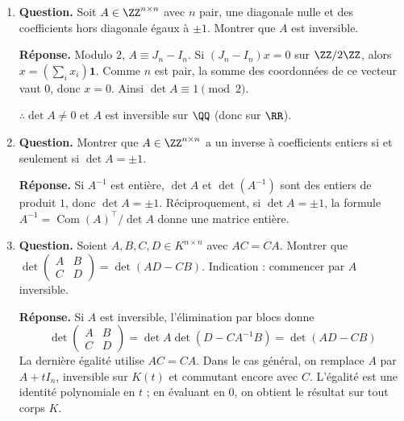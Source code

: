\documentclass[12pt, a4paper]{article}
\begin{document}
\begin{enumerate}[label=5.\arabic*., start=54]
  \item \begin{minipage}[t]{\linewidth}\raggedright
\textbf{Question.} Soit $A\in\ZZ^{n\times n}$ avec $n$ pair, une diagonale nulle et des coefficients hors diagonale égaux à $\pm1$. Montrer que $A$ est inversible.
\par\smallskip
\textbf{Réponse.} Modulo $2$, $A\equiv J_n-I_n$. Si $(J_n-I_n)x=0$ sur $\ZZ/2\ZZ$, alors
    $x=(\sum_i x_i)\boldsymbol{1}$.
    Comme $n$ est pair, la somme des coordonnées de ce vecteur vaut $0$, donc $x=0$.
    Ainsi $\det A\equiv1\pmod2$.

    $\therefore\det A\neq0$ et $A$ est inversible sur $\QQ$ (donc sur $\RR$).
\end{minipage}

  \item \begin{minipage}[t]{\linewidth}\raggedright
\textbf{Question.} Montrer que $A\in\ZZ^{n\times n}$ a un inverse à coefficients entiers si et seulement si $\det A=\pm1$.
\par\smallskip
\textbf{Réponse.} Si $A^{-1}$ est entière, $\det A$ et $\det(A^{-1})$ sont des entiers de produit $1$, donc $\det A=\pm1$.
    Réciproquement, si $\det A=\pm1$, la formule
    $A^{-1}=\operatorname{Com}(A)^\top/\det A$ donne une matrice entière.
\end{minipage}

  \item \begin{minipage}[t]{\linewidth}\raggedright
\textbf{Question.} Soient $A,B,C,D\in K^{n\times n}$ avec $AC=CA$. Montrer que $\det\begin{pmatrix}A&B\\C&D\end{pmatrix}=\det(AD-CB)$. Indication : commencer par $A$ inversible.
\par\smallskip
\textbf{Réponse.} Si $A$ est inversible, l'élimination par blocs donne
    \[
      \det\begin{pmatrix}A&B\\C&D\end{pmatrix}
      =\det A\det(D-CA^{-1}B)=\det(AD-CB)
    \]
    La dernière égalité utilise $AC=CA$.
    Dans le cas général, on remplace $A$ par $A+tI_n$, inversible sur $K(t)$ et commutant encore avec $C$.
    L'égalité est une identité polynomiale en $t$ ; en évaluant en $0$, on obtient le résultat sur tout corps $K$.
\end{minipage}


\end{enumerate}
\end{document}
